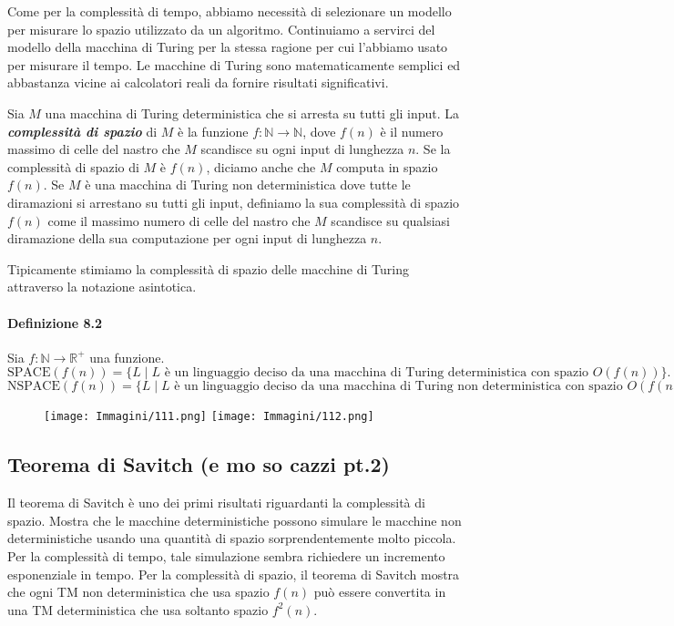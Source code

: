 \documentclass{article}
\begin{document}
Come per la complessità di tempo, abbiamo necessità di selezionare un modello per misurare lo spazio utilizzato da un algoritmo.
Continuiamo a servirci del modello della macchina di Turing per la stessa ragione per cui l'abbiamo usato per misurare il tempo.
Le macchine di Turing sono matematicamente semplici ed abbastanza vicine ai calcolatori reali da fornire risultati significativi.

\begin{tcolorbox}[colback=yellow!5!white, colframe=yellow!50!black, title=\textbf{Definizione 8.1}]
    Sia $M$ una macchina di Turing deterministica che si arresta
    su tutti gli input. 
    La \textit{\textbf{complessità di spazio}} di $M$ è la funzione $f: \mathbb{N} \rightarrow \mathbb{N}$, dove  $f(n)$ è il numero massimo di celle del nastro che $M$ scandisce su ogni input di lunghezza $n$.
    Se la complessità di spazio di $M$ è $f(n)$, diciamo anche che $M$ computa in spazio $f(n)$.
    Se $M$ è una macchina di Turing non deterministica dove tutte le diramazioni si arrestano su tutti gli input, definiamo la sua complessità di spazio $f(n)$ come il massimo numero di celle del nastro che $M$ scandisce su qualsiasi diramazione della sua computazione per ogni input di lunghezza $n$.
\end{tcolorbox}

Tipicamente stimiamo la complessità di spazio delle macchine di Turing attraverso la notazione asintotica.

\paragraph*{Definizione 8.2}
\label{definizione-8.2}
\vspace{1em}
\text{}
\newline
Sia $f : \mathbb{N} \rightarrow \mathbb{R}^+$ una funzione.
\[
\text{SPACE}(f(n)) = \{L \mid L \text{ è un linguaggio deciso da una macchina di Turing deterministica con spazio } O(f(n))\}.
\]
\[
\text{NSPACE}(f(n)) = \{L \mid L \text{ è un linguaggio deciso da una macchina di Turing non deterministica con spazio } O(f(n))\}.
\]

\begin{figure}[H]
    \centering
    \texttt{[image: Immagini/111.png]}
    \texttt{[image: Immagini/112.png]}
    \label{fig:space-complexity}
\end{figure}

\newpage
\subsection{Teorema di Savitch (e mo so cazzi pt.2)}
Il teorema di Savitch è uno dei primi risultati riguardanti la complessità di spazio. 
Mostra che le macchine deterministiche possono simulare le macchine non deterministiche usando una quantità di spazio sorprendentemente molto piccola.
Per la complessità di tempo, tale simulazione sembra richiedere un incremento esponenziale in tempo.
Per la complessità di spazio, il teorema di Savitch mostra che ogni TM non deterministica che usa spazio $f(n)$ può essere convertita in una TM deterministica che usa soltanto spazio $f^2(n)$.
\end{document}
